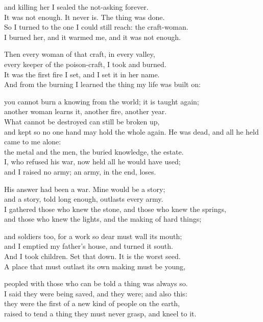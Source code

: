 \begin{founder}
and killing her I sealed the not-asking forever.\\
It was not enough. It never is. The thing was done.\\
So I turned to the one I could still reach: the craft-woman.\\
I burned her, and it warmed me, and it was not enough.\\
\medskip

Then every woman of that craft, in every valley,\\
every keeper of the poison-craft, I took and burned.\\
It was the first fire I set, and I set it in her name.\\
And from the burning I learned the thing my life was built on:\\
\medskip

you cannot burn a knowing from the world; it is taught again;\\
another woman learns it, another fire, another year.\\
What cannot be destroyed can still be broken up,\\
and kept so no one hand may hold the whole again.
\medskip
He was dead, and all he held came to me alone:\\
the metal and the men, the buried knowledge, the estate.\\
I, who refused his war, now held all he would have used;\\
and I raised no army; an army, in the end, loses.\\
\medskip

His answer had been a war. Mine would be a story;\\
and a story, told long enough, outlasts every army.\\
I gathered those who knew the stone, and those who knew the springs,\\
and those who knew the lights, and the making of hard things;\\
\medskip

and soldiers too, for a work so dear must wall its mouth;\\
and I emptied my father's house, and turned it south.\\
And I took children. Set that down. It is the worst seed.\\
A place that must outlast its own making must be young,\\
\medskip

peopled with those who can be told a thing was always so.\\
I said they were being saved, and they were; and also this:\\
they were the first of a new kind of people on the earth,\\
raised to tend a thing they must never grasp, and kneel to it.\\
\medskip


\end{founder}
